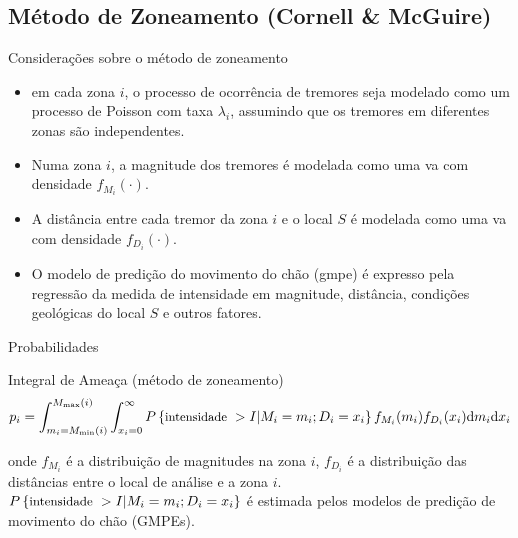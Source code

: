 \documentclass[ucs,8pt]{beamer}
\begin{document}
\subsection{Método de Zoneamento (Cornell \& McGuire)}

\begin{frame}{Considerações sobre o método de zoneamento}

	\begin{itemize}
		\item em cada zona $i$, o processo de ocorrência de tremores seja 
		modelado como um processo de Poisson com taxa $\lambda_i$, assumindo que os tremores em diferentes zonas são
		independentes.
		\item Numa zona $i$, a magnitude dos tremores é modelada como uma \gls{va}
		com densidade $f_{M_i}(\cdot)$.
		\item A distância entre cada tremor da zona $i$ e o local $S$ é modelada como uma \gls{va}
		com densidade $f_{D_i}(\cdot)$.
		\item O modelo de predição do movimento do chão (\gls{gmpe}) é expresso pela regressão da medida de intensidade
		em magnitude, distância, condições geológicas do local $S$ e outros fatores.
	\end{itemize}

\end{frame}



\begin{frame}{Probabilidades}
	\begin{block}{Integral de Ameaça (método de zoneamento)}
		\begin{equation} 
		p_i= \displaystyle \int_{m_i =M_{\min}(i)}^{M_{\max}(i)}
		\int_{x_i =0}^{\infty}  P \left\{ \mbox{\small intensidade \normalsize }>I| M_i = m_i; D_i = x_i \right\}f_{M_i}(m_i) f_{D_i}( x_i )
		\mathrm{d}m_i \mathrm{d}x_i
		\end{equation}
	\end{block}
	onde $f_{M_i}$ é a distribuição de magnitudes na zona $i$, 
	 $f_{D_i}$ é a distribuição das distâncias entre o local de análise e a zona
	 $i$. $P \left\{ \mbox{\small intensidade \normalsize }>I| M_i = m_i; D_i = x_i
	\right\}$ é estimada pelos modelos de predição de movimento do chão (GMPEs).
\end{frame}
\end{document}
